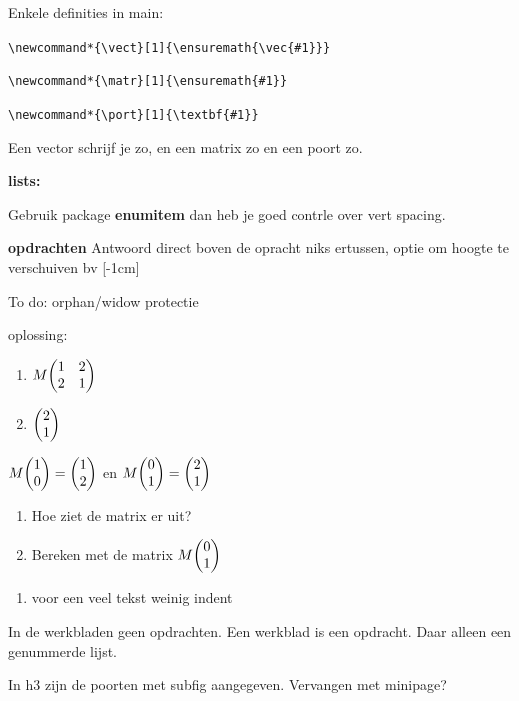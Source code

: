 \documentclass[../../main.tex]{subfiles}
\begin{document}
Enkele definities in main:

\verb+\newcommand*{\vect}[1]{\ensuremath{\vec{#1}}}+

\verb+\newcommand*{\matr}[1]{\ensuremath{#1}}+

\verb+\newcommand*{\port}[1]{\textbf{#1}}+

Een vector schrijf je  zo, en een matrix  zo en een poort  zo.

\textbf{lists:}

Gebruik package \textbf{enumitem}
dan heb je goed contrle over vert spacing.


\textbf{opdrachten}
Antwoord direct boven de opracht niks ertussen, optie om hoogte te verschuiven bv [-1cm]

To do: orphan/widow protectie

\begin{antwoord}[-1cm]
oplossing:
\begin{enumerate}
 \item $M\mqty(1&2\\2&1)$
 \item $\mqty(2\\1)$
\end{enumerate}
\end{antwoord}
\begin{opdracht}
$M\mqty(1\\0)=\mqty(1\\2)$ en $M\mqty(0\\1)=\mqty(2\\1)$
\begin{enumerate}
\item Hoe ziet de matrix er uit?
\item Bereken met de matrix $M\mqty(0\\1)$
\end{enumerate}
\end{opdracht}

\begin{antwoord}[-10cm]
\begin{enumerate}[start=9, wide, labelwidth=!, labelindent=0pt]
\item voor een veel tekst weinig indent
\end{enumerate}
\end{antwoord}

In de werkbladen geen opdrachten. Een werkblad is een opdracht. Daar alleen een genummerde lijst.

In h3 zijn de poorten met subfig aangegeven. Vervangen met minipage?
\end{document}
